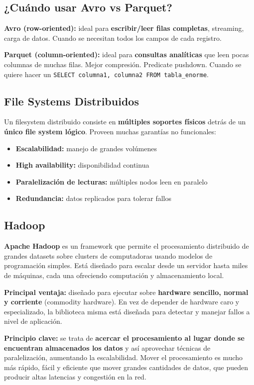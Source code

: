 \documentclass[11pt, a4paper]{article}
\begin{document}
\subsection{¿Cuándo usar Avro vs Parquet?}

\textbf{Avro (row-oriented):} ideal para \textbf{escribir/leer filas completas}, streaming, carga de datos. Cuando se necesitan todos los campos de cada registro.

\textbf{Parquet (column-oriented):} ideal para \textbf{consultas analíticas} que leen pocas columnas de muchas filas. Mejor compresión. Predicate pushdown. Cuando se quiere hacer un \texttt{SELECT columna1, columna2 FROM tabla\_enorme}.

\subsection{File Systems Distribuidos}

Un filesystem distribuido consiste en \textbf{múltiples soportes físicos} detrás de un \textbf{único file system lógico}. Proveen muchas garantías no funcionales:
\begin{itemize}
	\item \textbf{Escalabilidad:} manejo de grandes volúmenes
	\item \textbf{High availability:} disponibilidad continua
	\item \textbf{Paralelización de lecturas:} múltiples nodos leen en paralelo
	\item \textbf{Redundancia:} datos replicados para tolerar fallos
\end{itemize}

\subsection{Hadoop}

\textbf{Apache Hadoop} es un framework que permite el procesamiento distribuido de grandes datasets sobre clusters de computadoras usando modelos de programación simples. Está diseñado para escalar desde un servidor hasta miles de máquinas, cada una ofreciendo computación y almacenamiento local.

\textbf{Principal ventaja:} diseñado para ejecutar sobre \textbf{hardware sencillo, normal y corriente} (commodity hardware). En vez de depender de hardware caro y especializado, la biblioteca misma está diseñada para detectar y manejar fallos a nivel de aplicación.

\textbf{Principio clave:} se trata de \textbf{acercar el procesamiento al lugar donde se encuentran almacenados los datos} y así aprovechar técnicas de paralelización, aumentando la escalabilidad. Mover el procesamiento es mucho más rápido, fácil y eficiente que mover grandes cantidades de datos, que pueden producir altas latencias y congestión en la red.
\end{document}
